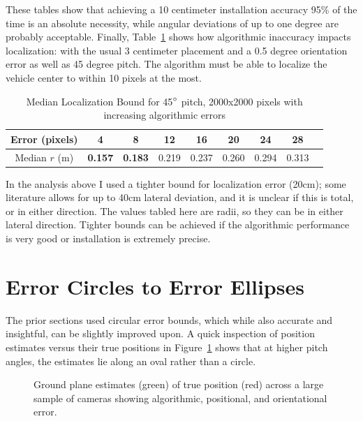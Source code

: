 \documentclass[a4paper,12pt,twoside,openright]{report}
\begin{document}
These tables show that achieving a 10 centimeter installation accuracy 95\% of the time is an absolute necessity, while angular deviations of up to
one degree are probably acceptable. Finally, Table~\ref{tab:camera:alg} shows how algorithmic inaccuracy impacts localization:
with the usual 3 centimeter placement and a 0.5 degree orientation error as well as 45 degree pitch. The algorithm must be able to
localize the vehicle center to within 10 pixels at the most. 

\begin{table}[htb]
\centering
\caption{Median Localization Bound for 45$\degree$ pitch, 2000x2000 pixels with increasing algorithmic errors}
\label{tab:camera:alg}
\begin{tabular}{ccccccccc}
\toprule
Error (pixels) & 4 & 8 & 12 & 16 & 20 & 24 & 28 \\ \midrule
Median $r$ (m)	&  \textbf{0.157} & \textbf{0.183} & 0.219 & 0.237 & 0.260 & 0.294 & 0.313 \\
\end{tabular} 
\end{table}

In the analysis above I used a tighter bound for localization error (20cm); some literature
allows for up to 40cm lateral deviation, and it is unclear if this is total, or in either direction.
The values tabled here are radii, so they can be in either lateral direction. Tighter bounds
can be achieved if the algorithmic performance is very good or installation is extremely precise.

\section{Error Circles to Error Ellipses}

The prior sections used circular error bounds, which while also accurate and insightful,
can be slightly improved upon. A quick inspection of position estimates versus their true
positions in Figure~\ref{fig:camera:distributions} shows that at higher pitch angles, the estimates lie 
along an oval rather than a circle.

\begin{figure}[htb]
    \begin{center}
        
    \end{center}
    \caption[Distribution of Estimates]{Ground plane estimates (green) of true position (red) across a large sample of cameras showing algorithmic, positional, and orientational error.}
    \label{fig:camera:distributions}
\end{figure}
\end{document}
